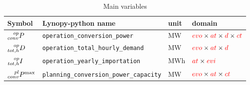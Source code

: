 \documentclass{article}
\begin{document}
\begin{table}[h]
\footnotesize %
  \centering
    \caption{Main variables}
  \begin{tabular}{llll}
    \hline
    
    \textbf{Symbol} & \textbf{Lynopy-python name} & \textbf{unit}  & \textbf{domain} \\ \hline
    
    $ \prescript{op}{conv}{P}$ & \verb|operation_conversion_power|  & MW & $\textcolor{red}{evo} \times \textcolor{red}{at} \times \textcolor{red}{d} \times \textcolor{red}{ct}$ \\
    
    $\prescript{op}{tot,h}{D} $ & \verb|operation_total_hourly_demand|& MW & $\textcolor{red}{evo} \times \textcolor{red}{at} \times \textcolor{red}{d}$ \\ 
    
    $\prescript{op}{tot,h}{I} $& \verb|operation_yearly_importation|& MWh & $\textcolor{red}{at} \times \textcolor{red}{evi}$ \\ \hline
    
    $\prescript{pl}{conv}{P^{\max}}$ & \verb|planning_conversion_power_capacity|& MW & $\textcolor{red}{evo} \times \textcolor{red}{at} \times \textcolor{red}{ct}$ \\ \hline
    
  \end{tabular}
\end{table}
\end{document}
